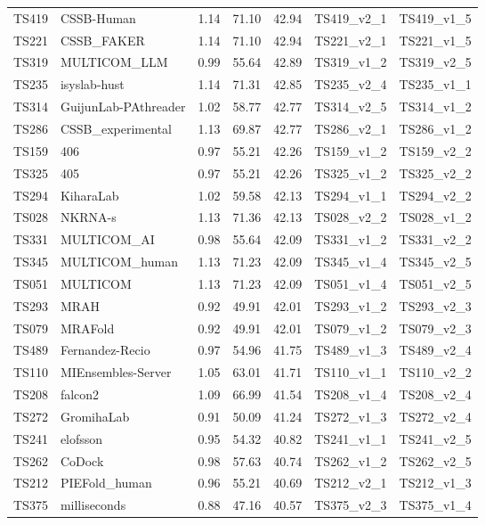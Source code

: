 \begin{longtable}{lllllll}
TS419 & CSSB-Human & 1.14 & 71.10 & 42.94 & TS419\_v2\_1 & TS419\_v1\_5 \\ 
TS221 & CSSB\_FAKER & 1.14 & 71.10 & 42.94 & TS221\_v2\_1 & TS221\_v1\_5 \\ 
TS319 & MULTICOM\_LLM & 0.99 & 55.64 & 42.89 & TS319\_v1\_2 & TS319\_v2\_5 \\ 
TS235 & isyslab-hust & 1.14 & 71.31 & 42.85 & TS235\_v2\_4 & TS235\_v1\_1 \\ 
TS314 & GuijunLab-PAthreader & 1.02 & 58.77 & 42.77 & TS314\_v2\_5 & TS314\_v1\_2 \\ 
TS286 & CSSB\_experimental & 1.13 & 69.87 & 42.77 & TS286\_v2\_1 & TS286\_v1\_2 \\ 
TS159 & 406 & 0.97 & 55.21 & 42.26 & TS159\_v1\_2 & TS159\_v2\_2 \\ 
TS325 & 405 & 0.97 & 55.21 & 42.26 & TS325\_v1\_2 & TS325\_v2\_2 \\ 
TS294 & KiharaLab & 1.02 & 59.58 & 42.13 & TS294\_v1\_1 & TS294\_v2\_2 \\ 
TS028 & NKRNA-s & 1.13 & 71.36 & 42.13 & TS028\_v2\_2 & TS028\_v1\_2 \\ 
TS331 & MULTICOM\_AI & 0.98 & 55.64 & 42.09 & TS331\_v1\_2 & TS331\_v2\_2 \\ 
TS345 & MULTICOM\_human & 1.13 & 71.23 & 42.09 & TS345\_v1\_4 & TS345\_v2\_5 \\ 
TS051 & MULTICOM & 1.13 & 71.23 & 42.09 & TS051\_v1\_4 & TS051\_v2\_5 \\ 
TS293 & MRAH & 0.92 & 49.91 & 42.01 & TS293\_v1\_2 & TS293\_v2\_3 \\ 
TS079 & MRAFold & 0.92 & 49.91 & 42.01 & TS079\_v1\_2 & TS079\_v2\_3 \\ 
TS489 & Fernandez-Recio & 0.97 & 54.96 & 41.75 & TS489\_v1\_3 & TS489\_v2\_4 \\ 
TS110 & MIEnsembles-Server & 1.05 & 63.01 & 41.71 & TS110\_v1\_1 & TS110\_v2\_2 \\ 
TS208 & falcon2 & 1.09 & 66.99 & 41.54 & TS208\_v1\_4 & TS208\_v2\_4 \\ 
TS272 & GromihaLab & 0.91 & 50.09 & 41.24 & TS272\_v1\_3 & TS272\_v2\_4 \\ 
TS241 & elofsson & 0.95 & 54.32 & 40.82 & TS241\_v1\_1 & TS241\_v2\_5 \\ 
TS262 & CoDock & 0.98 & 57.63 & 40.74 & TS262\_v1\_2 & TS262\_v2\_5 \\ 
TS212 & PIEFold\_human & 0.96 & 55.21 & 40.69 & TS212\_v2\_1 & TS212\_v1\_3 \\ 
TS375 & milliseconds & 0.88 & 47.16 & 40.57 & TS375\_v2\_3 & TS375\_v1\_4 \\ 

\end{longtable}
